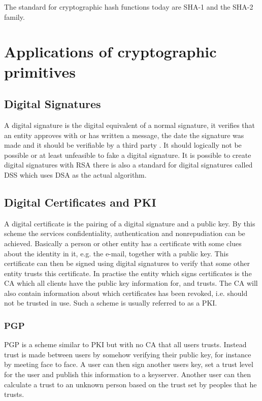 \documentclass[english,12pt,a4paper]{book}
\begin{document}
The standard for cryptographic hash functions today are \ac{SHA}-1 and the
\ac{SHA}-2 family.

\section{Applications of cryptographic primitives}

\subsection{Digital Signatures}
A digital signature is the digital equivalent of a normal signature, it
verifies that an entity approves with or has written a message, the date the
signature was made and it should be verifiable by a third party \cite[p.
379]{stallings}. It should logically not be possible or at least unfeasible to
fake a digital signature. It is possible to create digital signatures with
\ac{RSA} there is also a standard for digital signatures called \ac{DSS} which
uses \ac{DSA} as the actual algorithm.

\subsection{Digital Certificates and PKI} A digital certificate is the pairing
of a digital signature and a public key\cite{stallings}.  By this scheme the
services confidentiality, authentication and nonrepudiation can be achieved.
Basically a person or other entity has a certificate with some clues about the
identity in it, e.g. the e-mail, together with a public key. This certificate
can then be signed using digital signatures to verify that some other entity
trusts this certificate. In practise the entity which signs certificates is the
\ac{CA} which all clients have the public key information for, and trusts. The
\ac{CA} will also contain information about which certificates has been
revoked, i.e. should not be trusted in use. Such a scheme is usually referred
to as a \ac{PKI}.

\subsubsection{PGP} \ac{PGP} is a scheme similar to \ac{PKI} but with no
\ac{CA} that all users trusts\cite{stallings}. Instead trust is made between
users by somehow verifying their public key, for instance by meeting face to
face. A user can then sign another users key, set a trust level for the user
and publish this information to a keyserver. Another user can then calculate a
trust to an unknown person based on the trust set by peoples that he trusts. 
\end{document}
